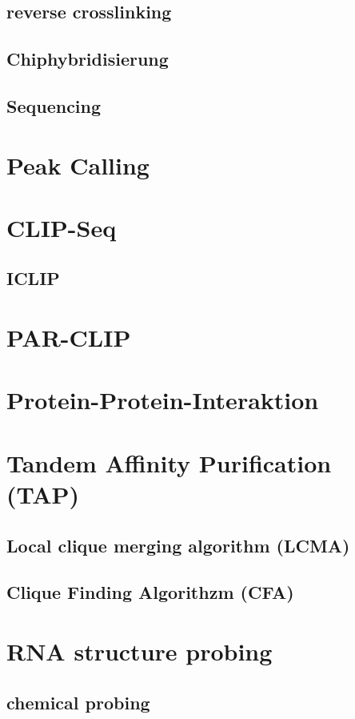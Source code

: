 \documentclass[12pt,a4paper]{article}
\begin{document}
\subsection{reverse crosslinking}

\subsection{Chiphybridisierung}

\subsection{Sequencing}

\section{Peak Calling}

\section{CLIP-Seq}

\subsection{ICLIP}

\section{PAR-CLIP}

\section{Protein-Protein-Interaktion}

\section{Tandem Affinity Purification (TAP)}

\subsection{Local clique merging algorithm (LCMA)}

\subsection{Clique Finding Algorithzm (CFA)}

\section{RNA structure probing}

\subsection{chemical probing}
\end{document}
